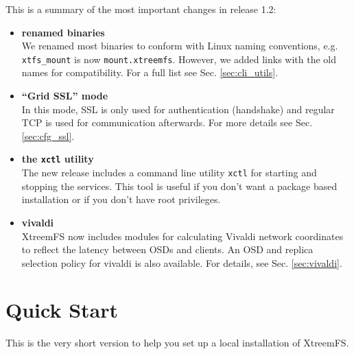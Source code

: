 \documentclass[a4paper,10pt]{book}
\begin{document}
This is a summary of the most important changes in release 1.2:

\begin{itemize}
 \item \textbf{renamed binaries}\\
 We renamed most binaries to conform with Linux naming conventions, e.g. \texttt{xtfs\_mount} is now \texttt{mount.xtreemfs}. However, we added links with the old names for compatibility. For a full list see Sec. \ref{sec:cli_utils}. 

 \item \textbf{``Grid SSL'' mode}\\
 In this mode, SSL is only used for authentication (handshake) and regular TCP is used for communication afterwards. For more details see Sec. \ref{sec:cfg_ssl}.

 \item \textbf{the \texttt{xctl} utility}\\
 The new release includes a command line utility \texttt{xctl} for starting and stopping the services. This tool is useful if you don't want a package based installation or if you don't have root privileges.

 \item \textbf{vivaldi}\\
 XtreemFS now includes modules for calculating Vivaldi network coordinates to reflect the latency between OSDs and clients. An OSD and replica selection policy for vivaldi is also available. For details, see Sec. \ref{sec:vivaldi}.

\end{itemize}


\chapter{Quick Start}
\label{sec:quick_start}

This is the very short version to help you set up a local installation of XtreemFS.
\end{document}
